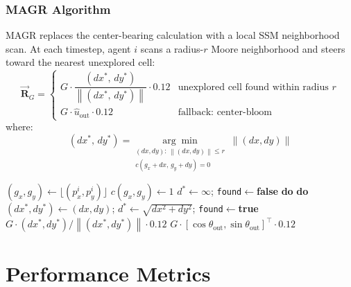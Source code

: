 \documentclass[journal,compsoc]{IEEEtran}
\newcommand{\vecc}[1]{\vec{\mathbf{#1}}}
\newcommand{\norm}[1]{\left\lVert#1\right\rVert}
\begin{document}
\subsubsection{MAGR Algorithm}
MAGR replaces the center-bearing calculation with a local SSM neighborhood scan.
At each timestep, agent $i$ scans a radius-$r$ Moore neighborhood and steers toward
the nearest unexplored cell:
\begin{equation}
    \vecc{R}_G = \begin{cases}
        G \cdot \dfrac{(dx^*,\,dy^*)}{\norm{(dx^*,\,dy^*)}}\cdot 0.12
            & \text{unexplored cell found within radius }r \\[0.8em]
        G \cdot \hat{u}_{\text{out}}\cdot 0.12
            & \text{fallback: center-bloom}
    \end{cases}
    \label{eq:magr}
\end{equation}
where:
\begin{equation}
    (dx^*,\,dy^*) = \underset{\substack{(dx,dy):\,\norm{(dx,dy)}\leq r \\ c(g_x+dx,\,g_y+dy)=0}}{\arg\min}\;\norm{(dx,dy)}
\end{equation}

\begin{algorithm}[H]
\caption{MAGR Repulsion Vector Computation for Agent $i$}
\label{alg:magr}
\begin{algorithmic}[1]
\State $(g_x,g_y)\gets\lfloor(p_x^i,p_y^i)\rfloor$
 $c(g_x,g_y)\gets 1$ \EndIf
\State $d^*\gets\infty$; \texttt{found}$\gets$\textbf{false}
 \textbf{ do}
     \textbf{ do}
            \State $(dx^*,dy^*)\gets(dx,dy)$; $d^*\gets\sqrt{dx^2{+}dy^2}$;
                   \texttt{found}$\gets$\textbf{true}
        \EndIf
    \EndFor
\EndFor
{}
    \State \Return $G\cdot(dx^*,dy^*)/\norm{(dx^*,dy^*)}\cdot 0.12$
\Else
    \State \Return $G\cdot[\cos\theta_{\text{out}},\sin\theta_{\text{out}}]^\top\cdot 0.12$
\EndIf
\end{algorithmic}
\end{algorithm}

\section{Performance Metrics}
\label{sec:metrics}
\end{document}

